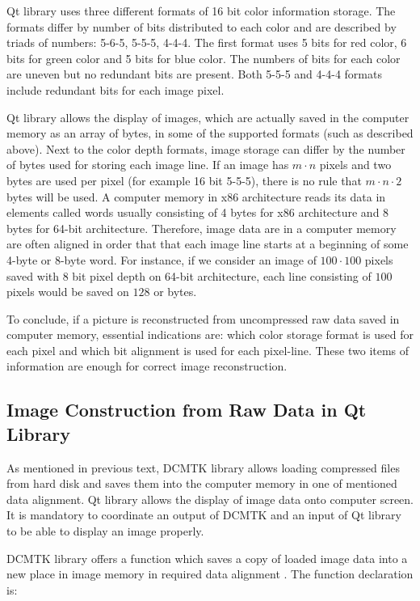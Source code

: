 Qt library uses three different formats of 16 bit color information storage\cite{QtDoc}. The formats differ by number of bits distributed to each color and are described by triads of numbers: 5-6-5, 5-5-5, 4-4-4. The first format uses 5 bits for red color, 6 bits for green color and 5 bits for blue color. The numbers of bits for each color are uneven but no redundant bits are present. Both 5-5-5 and 4-4-4 formats include redundant bits for each image pixel\cite[page~37]{fileformatencyclo}.

Qt library allows the display of images, which are actually saved in the computer memory as an array of bytes, in some of the supported formats (such as described above). Next to the color depth formats, image storage can differ by the number of bytes used for storing each image line. If an image has $m \cdot n$ pixels and two bytes are used per pixel (for example 16 bit 5-5-5), there is no rule that $m \cdot n \cdot 2$ bytes will be used. A computer memory in x86 architecture reads its data in elements called words usually consisting of 4 bytes for x86 architecture and 8 bytes for 64-bit architecture. Therefore, image data are in a computer memory are often aligned in order that that each image line starts at a beginning of some 4-byte or 8-byte word\cite{memoryalignment}. For instance, if we consider an image of $100 \cdot 100$ pixels saved with 8 bit pixel depth on 64-bit architecture, each line consisting of $100$ pixels would be saved on $128$ or bytes.

To conclude, if a picture is reconstructed from uncompressed raw data saved in computer memory, essential indications are: which color storage format is used for each pixel and which bit alignment is used for each pixel-line. These two items of information are enough for correct image reconstruction.

\subsection{Image Construction from Raw Data in Qt Library}
As mentioned in previous text, DCMTK library allows loading compressed files from hard disk and saves them into the computer memory in one of mentioned data alignment. Qt library allows the display of image data onto computer screen. It is mandatory to coordinate an output of DCMTK and an input of Qt library to be able to display an image properly.

DCMTK library offers a function which saves a copy of loaded image data into a new place in image memory in required data alignment \cite{dcmtksupport}. The function declaration is:

